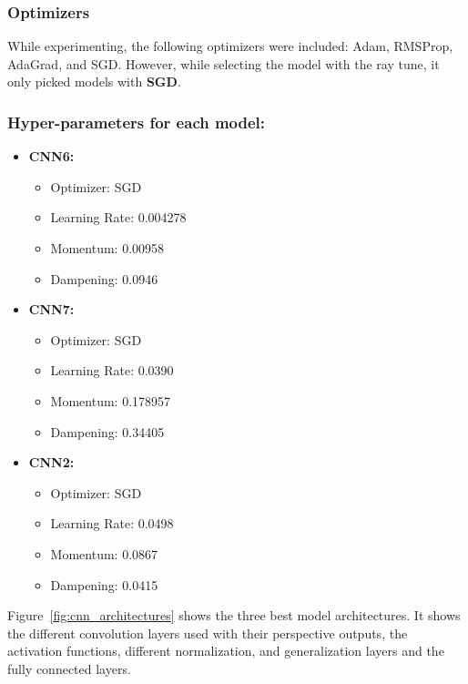 \documentclass[conference]{IEEEtran}
\begin{document}
\subsubsection{Optimizers} While experimenting, the following optimizers were included: Adam, RMSProp, AdaGrad, and SGD. However, while selecting the model with the ray tune, it only picked models with \textbf{SGD}.%

\subsubsection{Hyper-parameters for each model:}
\begin{itemize}
    \item \textbf{CNN6:}
          \begin{itemize}
              \item Optimizer: SGD
              \item Learning Rate: 0.004278%
              \item Momentum: 0.00958%
              \item Dampening: 0.0946%
          \end{itemize}
    \item \textbf{CNN7:}
          \begin{itemize}
              \item Optimizer: SGD
              \item Learning Rate: 0.0390%
              \item Momentum: 0.178957%
              \item Dampening: 0.34405%
          \end{itemize}
    \item \textbf{CNN2:}
          \begin{itemize}
              \item Optimizer: SGD
              \item Learning Rate: 0.0498%
              \item Momentum: 0.0867%
              \item Dampening: 0.0415%
          \end{itemize}
\end{itemize}

Figure~\ref{fig:cnn_architectures} shows the three best model architectures. It shows the different convolution layers used with their perspective outputs, the activation functions, different normalization, and generalization layers and the fully connected layers.
\end{document}
